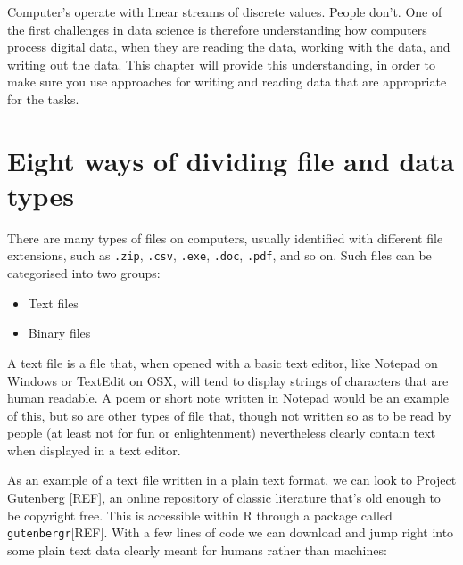 \documentclass[]{book}
\newenvironment{Shaded}{\begin{snugshade}}{\end{snugshade}}
\newcommand{\KeywordTok}[1]{\textcolor[rgb]{0.13,0.29,0.53}{\textbf{#1}}}
\newcommand{\StringTok}[1]{\textcolor[rgb]{0.31,0.60,0.02}{#1}}
\newcommand{\OperatorTok}[1]{\textcolor[rgb]{0.81,0.36,0.00}{\textbf{#1}}}
\newcommand{\NormalTok}[1]{#1}
\providecommand{\tightlist}{%
  \setlength{\itemsep}{0pt}\setlength{\parskip}{0pt}}
\theoremstyle{definition}
\theoremstyle{definition}
\theoremstyle{definition}
\theoremstyle{remark}
\begin{document}
Computer's operate with linear streams of discrete values. People don't.
One of the first challenges in data science is therefore understanding
how computers process digital data, when they are reading the data,
working with the data, and writing out the data. This chapter will
provide this understanding, in order to make sure you use approaches for
writing and reading data that are appropriate for the tasks.

\section{Eight ways of dividing file and data
types}\label{eight-ways-of-dividing-file-and-data-types}

There are many types of files on computers, usually identified with
different file extensions, such as \texttt{.zip}, \texttt{.csv},
\texttt{.exe}, \texttt{.doc}, \texttt{.pdf}, and so on. Such files can
be categorised into two groups:

\begin{itemize}
\tightlist
\item
  Text files
\item
  Binary files
\end{itemize}

A text file is a file that, when opened with a basic text editor, like
Notepad on Windows or TextEdit on OSX, will tend to display strings of
characters that are human readable. A poem or short note written in
Notepad would be an example of this, but so are other types of file
that, though not written so as to be read by people (at least not for
fun or enlightenment) nevertheless clearly contain text when displayed
in a text editor.

As an example of a text file written in a plain text format, we can look
to Project Gutenberg {[}REF{]}, an online repository of classic
literature that's old enough to be copyright free. This is accessible
within R through a package called \texttt{gutenbergr}{[}REF{]}. With a
few lines of code we can download and jump right into some plain text
data clearly meant for humans rather than machines:

\begin{Shaded}
\end{Shaded}
\end{document}
